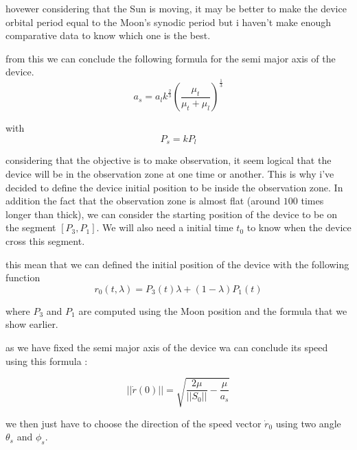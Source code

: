 \documentclass{article} %
\begin{document}
		hovewer considering that the Sun is moving, it may be better to make the device orbital period equal to the Moon's synodic period but i haven't make enough comparative data to know which one is the best.	
		
		from this we can conclude the following formula for the semi major axis of the device.
		$$
		a_s=a_lk^{\frac{2}{3}}\left(\frac{\mu_t}{\mu_t+\mu_l}\right)^\frac{1}{3}
		$$
		
		with
		$$
		P_s=kP_l
		$$
		
		considering that the objective is to make observation, it seem logical that the device will be in the observation zone at one time or another. This is why i've decided to define the device initial position to be inside the observation zone. In addition the fact that the observation zone is almost flat (around $100$ times longer than thick), we can consider the starting position of the device to be on the segment $[P_3,P_1]$. We will also need a initial time $t_0$ to know when the device cross this segment.
		
		this mean that we can defined the initial position of the device with the following function
		$$
		r_0(t,\lambda)=P_3(t)\lambda+(1-\lambda)P_1(t)
		$$
		
		where $P_3$ and $P_1$ are computed using the Moon position and the formula that we show earlier.
		
		
		
		
		
		as we have fixed the semi major axis of the device wa can conclude its speed using this formula :
		
		$$
		||\dot{r}(0)||=\sqrt{\frac{2\mu}{||S_0||}-\frac{\mu}{a_s}}
		$$
		
		
		we then just have to choose the direction of the speed vector $\dot{r}_0$ using two angle $\theta_s$ and $\phi_s$.
		
\end{document}
